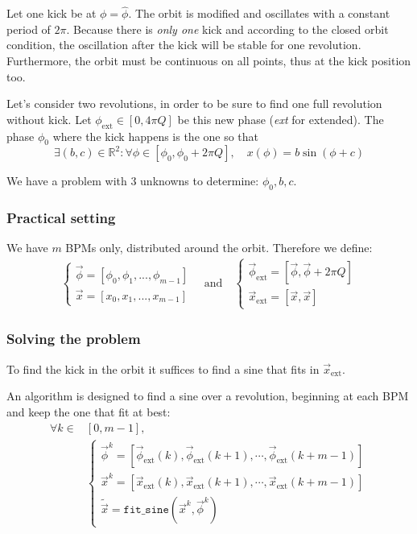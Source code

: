 Let one kick be at $\phi = \hat{\phi}$. The orbit is modified and oscillates with a constant period of $2 \pi$. Because there is {\em only one} kick and according to the closed orbit condition, the oscillation after the kick will be stable for one revolution. Furthermore, the orbit must be continuous on all points, thus at the kick position too.

Let's consider two revolutions, in order to be sure to find one full revolution without kick. Let $\phi_\mathrm{ext} \in [0, 4 \pi Q]$ be this new phase (\textit{ext} for extended). The phase $\phi_0$ where the kick happens is the one so that 
\begin{equation}
\exists (b, c) \in \mathbb{R}^2:
\forall \phi \in [\phi_0, \phi_0 + 2 \pi Q], \quad
x(\phi) = b \sin(\phi + c)
\end{equation}

We have a problem with 3 unknowns to determine: $\phi_0, b, c$. 

\subsubsection{Practical setting}

We have $m$ BPMs only, distributed around the orbit.
Therefore we define:
\begin{align}
\begin{cases}
\vec{\phi} = [\phi_0, \phi_1, ..., \phi_{m-1}] \\
\vec{x} = [x_0, x_1, ..., x_{m-1}]
\end{cases} \quad \mathrm{and} \quad
\begin{cases}
\vec{\phi}_\mathrm{ext} = [\vec{\phi}, \vec{\phi}+2\pi Q ]\\
\vec{x}_\mathrm{ext} = [\vec{x}, \vec{x}]
\end{cases}
\end{align}

\subsubsection{Solving the problem}

To find the kick in the orbit it suffices to find a sine that fits in $\vec{x}_\mathrm{ext}$.

An algorithm is designed to find a sine over a revolution, beginning at each BPM and keep the one that fit at best:
\begin{align}
\forall k \in &[0, m-1], \nonumber \\
&\begin{cases}
\vec{\phi}^k = [\vec{\phi}_\mathrm{ext}(k), \vec{\phi}_\mathrm{ext}(k+1), \cdots,  \vec{\phi}_\mathrm{ext}(k+m-1)]\\
\vec{x}^k = [\vec{x}_\mathrm{ext}(k), \vec{x}_\mathrm{ext}(k+1), \cdots,  \vec{x}_\mathrm{ext}(k+m-1)]\\
\tilde{\vec{x}} = \mathtt{fit\_sine}(\vec{x}^k, \vec{\phi}^k)
\end{cases}
\end{align}

